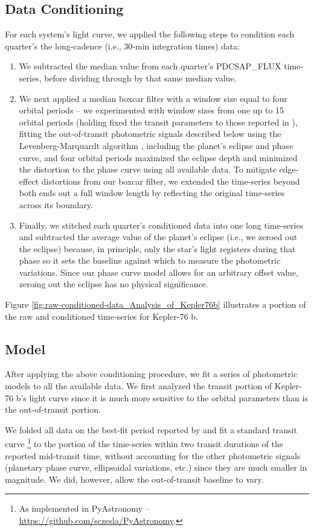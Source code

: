 \documentclass[manuscript]{aastex62}
\begin{document}
\subsection{Data Conditioning}
For each system's light curve, we applied the following steps to condition each quarter's the long-cadence (i.e., 30-min integration times) data:
\begin{enumerate}
\item We subtracted the median value from each quarter's PDCSAP\_FLUX time-series, before dividing through by that same median value.
\item We next applied a median boxcar filter with a window size equal to four orbital periods -- we experimented with window sizes from one up to 15 orbital periods (holding fixed the transit parameters to those reported in \citealt{2013ApJ...771...26F}), fitting the out-of-transit photometric signals described below using the Levenberg-Marquardt algorithm \citep{newville_2014_11813}, including the planet's eclipse and phase curve, and four orbital periods maximized the eclipse depth and minimized the distortion to the phase curve using all available data. To mitigate edge-effect distortions from our boxcar filter, we extended the time-series beyond both ends out a full window length by reflecting the original time-series across its boundary.
\item Finally, we stitched each quarter's conditioned data into one long time-series and subtracted the average value of the planet's eclipse (i.e., we zeroed out the eclipse) because, in principle, only the star's light registers during that phase so it sets the baseline against which to measure the photometric variations. Since our phase curve model allows for an arbitrary offset value, zeroing out the eclipse has no physical significance.
\end{enumerate}
Figure \ref{fig:raw-conditioned-data_Analysis_of_Kepler76b} illustrates a portion of the raw and conditioned time-series for Kepler-76 b. 

\subsection{Model}
After applying the above conditioning procedure, we fit a series of photometric models to all the available data. We first analyzed the transit portion of Kepler-76 b's light curve since it is much more sensitive to the orbital parameters than is the out-of-transit portion. 

We folded all data on the best-fit period reported by \citet{2013ApJ...771...26F} and fit a standard transit curve \citep{2002ApJ...580L.171M}\footnote{As implemented in PyAstronomy -- \url{https://github.com/sczesla/PyAstronomy}.} to the portion of the time-series within two transit durations of the reported mid-transit time, without accounting for the other photometric signals (planetary phase curve, ellipsoidal variations, etc.) since they are much smaller in magnitude. We did, however, allow the out-of-transit baseline to vary. 
\end{document}
